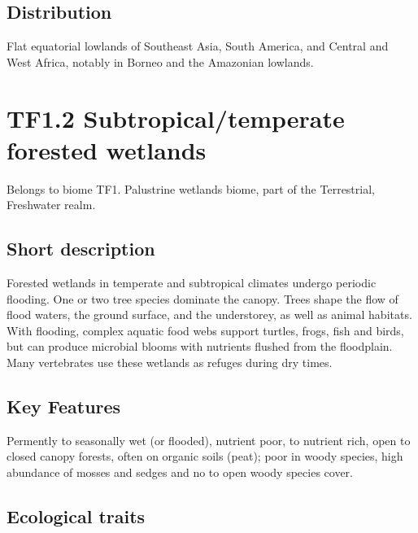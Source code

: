 \documentclass[
  letterpaper,
  DIV=11,
  numbers=noendperiod]{scrartcl}
\begin{document}
\subsection{Distribution}\label{distribution-103}

Flat equatorial lowlands of Southeast Asia, South America, and Central
and West Africa, notably in Borneo and the Amazonian lowlands.

\section{TF1.2 Subtropical/temperate forested
wetlands}\label{tf1.2-subtropicaltemperate-forested-wetlands}

Belongs to biome TF1. Palustrine wetlands biome, part of the
Terrestrial, Freshwater realm.

\subsection{Short description}\label{short-description-104}

Forested wetlands in temperate and subtropical climates undergo periodic
flooding. One or two tree species dominate the canopy. Trees shape the
flow of flood waters, the ground surface, and the understorey, as well
as animal habitats. With flooding, complex aquatic food webs support
turtles, frogs, fish and birds, but can produce microbial blooms with
nutrients flushed from the floodplain. Many vertebrates use these
wetlands as refuges during dry times.

\subsection{Key Features}\label{key-features-104}

Permently to seasonally wet (or flooded), nutrient poor, to nutrient
rich, open to closed canopy forests, often on organic soils (peat); poor
in woody species, high abundance of mosses and sedges and no to open
woody species cover.

\subsection{Ecological traits}\label{ecological-traits-104}
\end{document}
